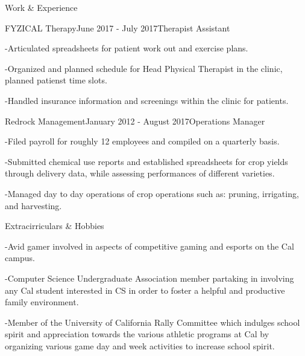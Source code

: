 \documentclass{resume} %
\begin{document}
\begin{rSection}{Work \& Experience}

\begin{rSubsection}{FYZICAL Therapy}{June 2017 - July 2017}{Therapist Assistant}{}
\item -Articulated spreadsheets for patient work out and exercise plans.
\item -Organized and planned schedule for Head Physical Therapist in the clinic, planned patienst time slots.
\item -Handled insurance information and screenings within the clinic for patients.
\end{rSubsection}



\begin{rSubsection}{Redrock Management}{January 2012 - August 2017}{Operations Manager}{}
\item -Filed payroll for roughly 12 employees and compiled on a quarterly basis. 
\item -Submitted chemical use reports and established spreadsheets for crop yields through delivery data, while assessing performances of different varieties.
\item -Managed day to day operations of crop operations such as: pruning, irrigating, and harvesting.
\end{rSubsection}

\end{rSection}



\begin{rSection}{Extracirriculars \& Hobbies} \itemsep -2pt
\item -Avid gamer involved in aspects of competitive gaming and esports on the Cal campus. 
\item -Computer Science Undergraduate Association member partaking in involving any Cal student interested in CS in order to foster a helpful and productive family environment.
\item -Member of the University of California Rally Committee which indulges school spirit and appreciation towards the various athletic programs at Cal by organizing various game day and week activities to increase school spirit. 
\end{rSection}
\end{document}
